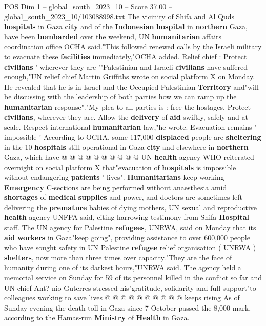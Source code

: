 \begin{textsample}{POS Dim 1 – global\_south\_2023\_10 – Score 37.00 – global\_south\_2023\_10/103088998.txt}  \label{ex:f1_pos_183}
The vicinity of Shifa and Al Quds \textbf{hospitals} in Gaza \textbf{city} and of the \textbf{Indonesian} \textbf{hospital} in \textbf{northern} Gaza, have been \textbf{bombarded} over the weekend, UN \textbf{humanitarian} affairs coordination office OCHA said."This followed renewed calls by the Israeli military to evacuate these \textbf{facilities} immediately,"OCHA added.
Relief chief : Protect \textbf{civilians} ' wherever they are '"Palestinian and Israeli \textbf{civilians} have suffered enough,"UN relief chief Martin Griffiths wrote on social platform X on Monday.
He revealed that he is in Israel and the Occupied Palestinian \textbf{Territory} and"will be discussing with the leadership of both parties how we can ramp up the \textbf{humanitarian} response"."My plea to all parties is : free the hostages.
Protect \textbf{civilians}, wherever they are.
Allow the \textbf{delivery} of \textbf{aid} swiftly, safely and at scale.
Respect international \textbf{humanitarian} law,"he wrote.
Evacuation remains ' impossible ' According to OCHA, some 117,000 \textbf{displaced} people are \textbf{sheltering} in the 10 \textbf{hospitals} still operational in Gaza \textbf{city} and elsewhere in \textbf{northern} Gaza, which have @ @ @ @ @ @ @ @ @ @ UN \textbf{health} agency WHO reiterated overnight on social platform X that"evacuation of \textbf{hospitals} is impossible without endangering \textbf{patients} ' lives". \textbf{Humanitarians} keep working \textbf{Emergency} C-sections are being performed without anaesthesia amid \textbf{shortages} of \textbf{medical} \textbf{supplies} and power, and doctors are sometimes left delivering the \textbf{premature} babies of dying mothers, UN sexual and reproductive \textbf{health} agency UNFPA said, citing harrowing testimony from Shifa \textbf{Hospital} staff.
The UN agency for Palestine \textbf{refugees}, UNRWA, said on Monday that its \textbf{aid} \textbf{workers} in Gaza"keep going", providing assistance to over 600,000 people who have sought safety in UN Palestine \textbf{refugee} relief organisation ( UNRWA ) \textbf{shelters}, now more than three times over capacity."They are the face of humanity during one of its darkest hours,"UNRWA said.
The agency held a memorial service on Sunday for 59 of its personnel killed in the conflict so far and UN chief Ant? nio Guterres stressed his"gratitude, solidarity and full support"to colleagues working to save lives @ @ @ @ @ @ @ @ @ @ keeps rising As of Sunday evening the death toll in Gaza since 7 October passed the 8,000 mark, according to the Hamas-run \textbf{Ministry} of \textbf{Health} in Gaza.

\end{textsample}
